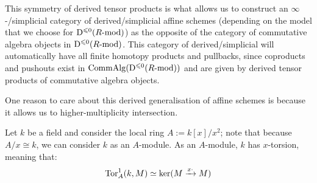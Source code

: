         This symmetry of derived tensor products is what allows us to construct an $\infty$-/simplicial category of derived/simplicial affine schemes (depending on the model that we choose for $\mathrm{D}^{\leqslant 0}(R\text{-}\mathrm{mod})$) as the opposite of the category of commutative algebra objects in $\mathrm{D}^{\leqslant 0}(R\text{-}\mathrm{mod})$. This category of derived/simplicial will automatically have all finite homotopy products and pullbacks, since coproducts and pushouts exist in $\mathrm{Comm}\mathrm{Alg}(\mathrm{D}^{\leqslant 0}(R\text{-}\mathrm{mod}))$ and are given by derived tensor products of commutative algebra objects.

        One reason to care about this derived generalisation of affine schemes is because it allows us to  higher-multiplicity intersection.
        \begin{example}
            Let $k$ be a field and consider the local ring $A := k[x]/x^2$; note that because $A/x \cong k$, we can consider $k$ as an $A$-module. As an $A$-module, $k$ has $x$-torsion, meaning that:
                $$\mathrm{Tor}_A^1(k, M) \simeq \ker(M \xrightarrow[]{x \cdot} M)$$
            
        \end{example}
    
    \printbibliography

